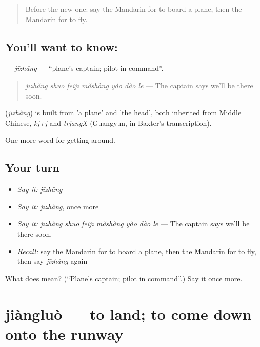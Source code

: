 \begin{quote}
Before the new one: say the Mandarin for to board a plane, then the Mandarin for to fly.
\end{quote}

\subsection*{You'll want to know: }
\textbf{} — \emph{jīzhǎng} — \textquotedblleft{}plane's captain; pilot in command\textquotedblright{}.

\begin{quote}
\textbf{} \emph{jīzhǎng shuō fēijī mǎshàng yào dào le} — The captain says we'll be there soon.
\end{quote}

\begin{cousinweb}
\textbf{} (\emph{jīzhǎng}) is built from  'a plane' and  'the head', both inherited from Middle Chinese, \emph{kj+j} and \emph{trjangX} (Guangyun, in Baxter's transcription).
\end{cousinweb}

\begin{grammarlens}[title={What you've built}]
One more word for getting around.
\end{grammarlens}

\subsection*{Your turn}
\begin{itemize}
\raggedright
  \item \emph{Say it:} \emph{jīzhǎng}
  \item \emph{Say it:} \emph{jīzhǎng}, once more
  \item \emph{Say it:} \emph{jīzhǎng shuō fēijī mǎshàng yào dào le} — The captain says we'll be there soon.
  \item \emph{Recall:} say the Mandarin for to board a plane, then the Mandarin for to fly, then say \emph{jīzhǎng} again
\end{itemize}

\begin{tcolorbox}[breakable,colback=teal!4,colframe=teal!35!black,title={Before you move on}]
What does  mean? (\textquotedblleft{}Plane's captain; pilot in command\textquotedblright{}.) Say it once more.
\end{tcolorbox}
\section[jiàngluò]{jiàngluò — to land; to come down onto the runway}


